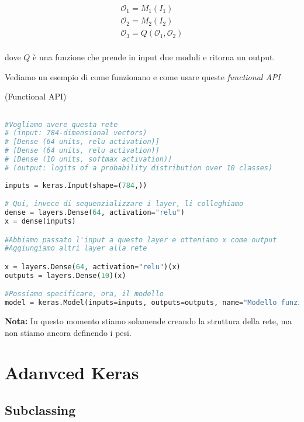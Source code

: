 \begin{equation}
    \begin{aligned}
        \mathcal{O}_1 = M_1(I_1)                        \\
        \mathcal{O}_2 = M_2(I_2)                        \\
        \mathcal{O}_3 = Q(\mathcal{O}_1, \mathcal{O}_2) \\
    \end{aligned}
\end{equation}

dove $Q$ è una funzione che prende in input due moduli e ritorna un output.

Vediamo un esempio di come funzionano e come usare queste \textit{functional
    API}

\begin{esempio}(Functional API)
\end{esempio}

\begin{lstlisting}[language=Python]

#Vogliamo avere questa rete 
# (input: 784-dimensional vectors)
# [Dense (64 units, relu activation)]
# [Dense (64 units, relu activation)]
# [Dense (10 units, softmax activation)]
# (output: logits of a probability distribution over 10 classes)
    
inputs = keras.Input(shape=(784,))

# Qui, invece di sequenzializzare i layer, li colleghiamo
dense = layers.Dense(64, activation="relu")
x = dense(inputs)

#Abbiamo passato l'input a questo layer e otteniamo x come output
#Aggiungiamo altri layer alla rete

x = layers.Dense(64, activation="relu")(x)
outputs = layers.Dense(10)(x)

#Possiamo specificare, ora, il modello 
model = keras.Model(inputs=inputs, outputs=outputs, name="Modello funzionale")
\end{lstlisting}

\textbf{Nota:} In questo momento stiamo solamende creando la struttura
della rete, ma non stiamo ancora definendo i pesi.

\newpage

\section{Adanvced Keras}

\subsection{Subclassing}

